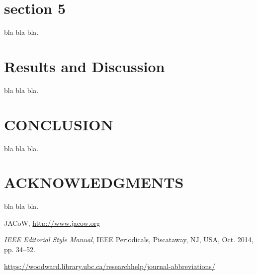 \documentclass[letter,
               biblatex,     %
               keeplastbox,   %
               ]{jacow}
\begin{document}
\section{section 5}

bla bla bla.

\section{Results and Discussion}

bla bla bla.


\section{CONCLUSION}

bla bla bla.

\section{ACKNOWLEDGMENTS}

bla bla bla.


%
%
%
	{\printbibliography}%
	{%
	
	\begin{thebibliography}{9} %
	
		JACoW,
		\url{http://www.jacow.org}
	
		\textit{IEEE Editorial Style Manual},
		IEEE Periodicals, Piscataway,
		NJ, USA, Oct. 2014, pp. 34--52.

	\url{https://woodward.library.ubc.ca/researchhelp/journal-abbreviations/}

	\end{thebibliography}
} %
\end{document}
